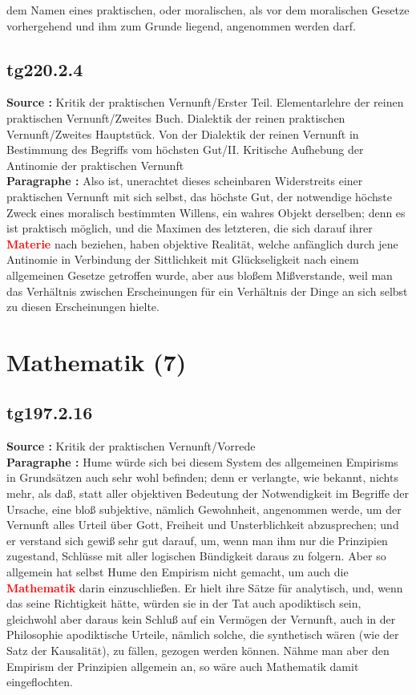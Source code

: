 \documentclass[a4paper,12pt,twoside]{book}
\newcommand{\match}[1]{\textcolor{red}{\textbf{#1}}}
\newcommand{\unnumberedsection}[1]{
	\section*{#1}
	\addcontentsline{toc}{section}{#1}
	\markright{#1}
}
\begin{document}
dem Namen eines praktischen, oder moralischen, als vor dem moralischen Gesetze vorhergehend und ihm zum Grunde liegend, angenommen werden darf. 
	
	\subsection*{tg220.2.4} 
	\textbf{Source : }Kritik der praktischen Vernunft/Erster Teil. Elementarlehre der reinen praktischen Vernunft/Zweites Buch. Dialektik der reinen praktischen Vernunft/Zweites Hauptstück. Von der Dialektik der reinen Vernunft in Bestimmung des Begriffs vom höchsten Gut/II. Kritische Aufhebung der Antinomie der praktischen Vernunft\\  
	
	\noindent\textbf{Paragraphe : }Also ist, unerachtet dieses scheinbaren Widerstreits einer praktischen Vernunft mit sich selbst, das höchste Gut, der notwendige höchste Zweck eines moralisch bestimmten Willens, ein wahres Objekt derselben; denn es ist praktisch möglich, und die Maximen des letzteren, die sich darauf ihrer \match{Materie} nach beziehen, haben objektive Realität, welche anfänglich durch jene Antinomie in Verbindung der Sittlichkeit mit Glückseligkeit nach einem allgemeinen Gesetze getroffen wurde, aber aus bloßem Mißverstande, weil man das Verhältnis zwischen Erscheinungen für ein Verhältnis der Dinge an sich selbst zu diesen Erscheinungen hielte. 
	
	\unnumberedsection{Mathematik (7)} 
	\subsection*{tg197.2.16} 
	\textbf{Source : }Kritik der praktischen Vernunft/Vorrede\\  
	
	\noindent\textbf{Paragraphe : }
	Hume würde sich bei diesem System des allgemeinen Empirisms in Grundsätzen auch sehr wohl befinden; denn er verlangte, wie bekannt, nichts mehr, als daß, statt aller objektiven Bedeutung der Notwendigkeit im Begriffe der Ursache, eine bloß subjektive, nämlich Gewohnheit, angenommen werde, um der Vernunft alles Urteil über Gott, Freiheit und Unsterblichkeit abzusprechen; und er verstand sich gewiß sehr gut darauf, um, wenn man ihm nur die Prinzipien zugestand, Schlüsse mit aller logischen Bündigkeit daraus zu folgern. Aber so allgemein hat selbst Hume den Empirism nicht gemacht, um auch die \match{Mathematik} darin einzuschließen. Er hielt ihre Sätze für analytisch, und, wenn das seine Richtigkeit hätte, würden sie in der Tat auch apodiktisch sein, gleichwohl aber daraus kein Schluß auf ein Vermögen der Vernunft, auch in der Philosophie apodiktische Urteile, nämlich solche, die synthetisch wären (wie der Satz der Kausalität), zu fällen, gezogen werden können. Nähme man aber den Empirism der Prinzipien allgemein an, so wäre auch Mathematik damit eingeflochten. 
	
\end{document}
